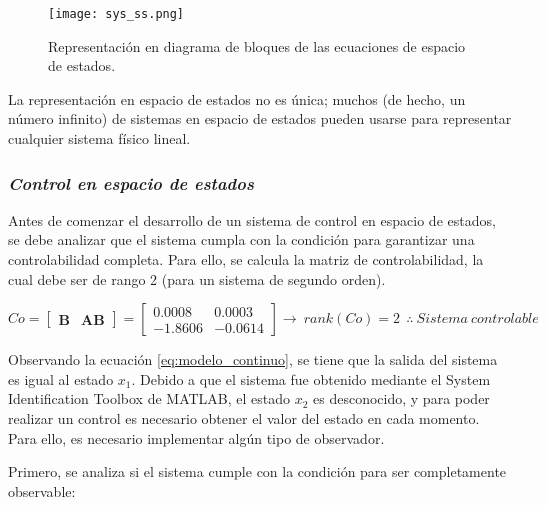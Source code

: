 \begin{figure}[H]
    \centering
    \texttt{[image: sys\_ss.png]}
    \vspace{-0.25cm}
    \caption{Representación en diagrama de bloques de las ecuaciones de espacio de estados.}
    \label{fig:sys_ss}
\end{figure}
\vspace{-0.5cm}

La representación en espacio de estados no es única; muchos (de hecho, un número infinito) de sistemas en espacio de estados pueden usarse para representar cualquier sistema físico lineal.



\subsubsection*{\it{Control en espacio de estados}}
\vspace{-0.25cm}

Antes de comenzar el desarrollo de un sistema de control en espacio de estados, se debe analizar
que el sistema cumpla con la condición para garantizar una controlabilidad completa. Para ello,
se calcula la matriz de controlabilidad, la cual debe ser de rango 2 (para un sistema de segundo orden).

\vspace{-0.5cm}
\begin{equation}
    Co
    =
    \begin{bmatrix}
        \textbf{B} & \textbf{AB}
    \end{bmatrix}
    =
    \begin{bmatrix}
        0.0008  & 0.0003    \\
        -1.8606 & -0.0614
    \end{bmatrix}
    \rightarrow
    \
    rank(Co) = 2\            
    \
    \therefore
    \ Sistema\  controlable
\end{equation}
\vspace{-0.5cm}


Observando la ecuación \ref{eq:modelo_continuo}, se tiene que la salida del sistema es igual
al estado $x_1$. Debido a que el sistema fue obtenido mediante el System Identification Toolbox de MATLAB,
el estado $x_2$ es desconocido, y para poder realizar un control es necesario obtener el valor del 
estado en cada momento. Para ello, es necesario implementar algún tipo de observador.

Primero, se analiza si el sistema cumple con la condición para ser completamente observable:

